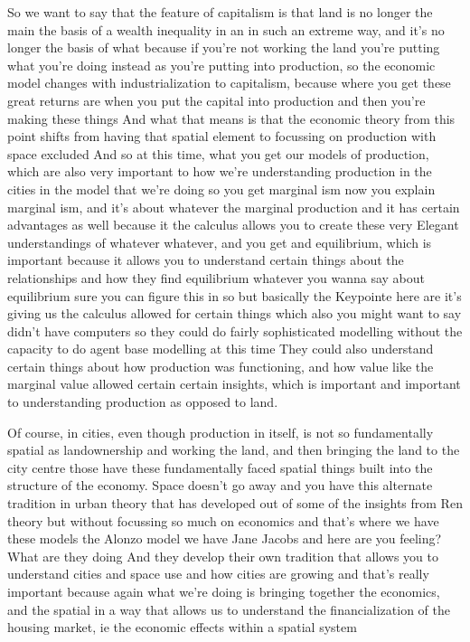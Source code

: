So we want to say that the feature of capitalism is that land is no longer the main the basis of a wealth inequality in an in such an extreme way, and it’s no longer the basis of what because if you’re not working the land you’re putting what you’re doing instead as you’re putting into production, so the economic model changes with industrialization to capitalism, because where you get these great returns are when you put the capital into production and then you’re making these things
And what that means is that the economic theory from this point shifts from having that spatial element to focussing on production with space excluded
And so at this time, what you get our models of production, which are also very important to how we’re understanding production in the cities in the model that we’re doing so you get marginal ism now you explain marginal ism, and it’s about whatever the marginal production and it has certain advantages as well because it the calculus allows you to create these very Elegant understandings of whatever whatever, and you get and equilibrium, which is important because it allows you to understand certain things about the relationships and how they find equilibrium whatever you wanna say about equilibrium sure you can figure this in so but basically the Keypointe here are it’s giving us the calculus allowed for certain things which also you might want to say didn’t have computers so they could do fairly sophisticated modelling without the capacity to do agent base modelling at this time They could also understand certain things about how production was functioning, and how value like the marginal value allowed certain certain insights, which is important and important to understanding production as opposed to land.

Of course, in cities, even though production in itself, is not so fundamentally spatial as landownership and working the land, and then bringing the land to the city centre those have these fundamentally faced spatial things built into the structure of the economy. Space doesn’t go away and you have this alternate tradition in urban theory that has developed out of some of the insights from Ren theory but without focussing so much on economics and that’s where we have these models the Alonzo model we have Jane Jacobs and here are you feeling? What are they doing And they develop their own tradition that allows you to understand cities and space use and how cities are growing and that’s really important because again what we’re doing is bringing together the economics, and the spatial in a way that allows us to understand the financialization of the housing market, ie the economic effects within a spatial system

